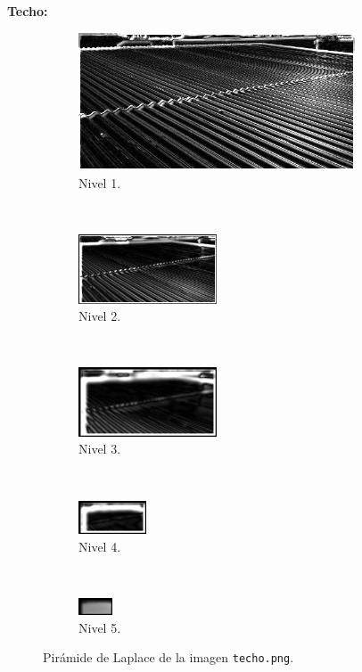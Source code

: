 \documentclass[12pt, letterpaper]{article}
\begin{document}
\par \textbf{Techo:}

\begin{figure}[H]
  \centering
  \begin{subfigure}[t]{0.48\textwidth}
    \centering
    \includegraphics[width = 0.9\textwidth]{techo/lp1.png}
    \caption{Nivel 1.}
  \end{subfigure}
  ~ 
  \begin{subfigure}[t]{0.48\textwidth}
      \centering
      \includegraphics[width = 0.45\textwidth]{techo/lp2.png}
      \caption{Nivel 2.}
  \end{subfigure}
  ~ 
  \begin{subfigure}[t]{0.32\textwidth}
      \centering
      \includegraphics[width = 0.45\textwidth]{techo/lp3.png}
      \caption{Nivel 3.}
  \end{subfigure}
  ~ 
  \begin{subfigure}[t]{0.32\textwidth}
      \centering
      \includegraphics[width = 0.22\textwidth]{techo/lp4.png}
      \caption{Nivel 4.}
  \end{subfigure}
  ~ 
  \begin{subfigure}[t]{0.32\textwidth}
      \centering
      \includegraphics[width = 0.11\textwidth]{techo/lp5.png}
      \caption{Nivel 5.}
  \end{subfigure}
  \caption{Pirámide de Laplace de la imagen \texttt{techo.png}.}
  \label{lptecho}
\end{figure}
\end{document}
